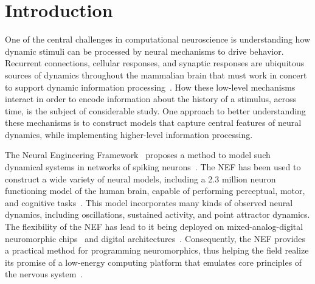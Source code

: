\documentclass[12pt]{article}
\theoremstyle{definition}
\begin{document}

\section{Introduction}

One of the central challenges in computational neuroscience is understanding how dynamic stimuli can be processed by neural mechanisms to drive behavior.
Recurrent connections, cellular responses, and synaptic responses are ubiquitous sources of dynamics throughout the mammalian brain that must work in concert to support dynamic information processing~\citep{kandel2000principles}.
How these low-level mechanisms interact in order to encode information about the history of a stimulus, across time, is the subject of considerable study.
One approach to better understanding these mechanisms is to construct models that capture central features of neural dynamics, while implementing higher-level information processing.




The Neural Engineering Framework~\citep[NEF;][]{eliasmith1999developing, eliasmith2003neural} proposes a method to model such dynamical systems in networks of spiking neurons~\citep[see][for reviews of other methods]{abbott2016building, deneve2016efficient}.
The NEF has been used to construct a wide variety of neural models, including a 2.3 million neuron functioning model of the human brain, capable of performing perceptual, motor, and cognitive tasks~\citep{eliasmith2012large}.
This model incorporates many kinds of observed neural dynamics, including oscillations, sustained activity, and point attractor dynamics.
The flexibility of the NEF has lead to it being deployed on mixed-analog-digital neuromorphic chips~\citep{choudhary2012silicon, corradi2014, voelker2017iscas, voelker2017neuromorphic} and digital architectures~\citep{bekolay2013nengo, wang2014compact, mundy2015efficient, berzish2016}.
Consequently, the NEF provides a practical method for programming neuromorphics, thus helping the field realize its promise of a low-energy computing platform that emulates core principles of the nervous system~\citep{boahen2017neuromorph}.
\end{document}
